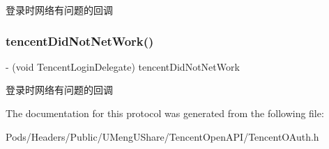 登录时网络有问题的回调 \mbox{\label{protocol_tencent_login_delegate_01-p_a575251b715cf413d43fba79cfaa4041c}} 
\subsubsection{\texorpdfstring{tencent\+Did\+Not\+Net\+Work()}{tencentDidNotNetWork()}\hspace{0.1cm}{\footnotesize\ttfamily [2/2]}}
{\footnotesize\ttfamily -\/ (void Tencent\+Login\+Delegate) tencent\+Did\+Not\+Net\+Work \begin{DoxyParamCaption}{ }\end{DoxyParamCaption}\hspace{0.3cm}{\ttfamily [required]}}

登录时网络有问题的回调 

The documentation for this protocol was generated from the following file\+:\begin{DoxyCompactItemize}
\item 
Pods/\+Headers/\+Public/\+U\+Meng\+U\+Share/\+Tencent\+Open\+A\+P\+I/Tencent\+O\+Auth.\+h\end{DoxyCompactItemize}
